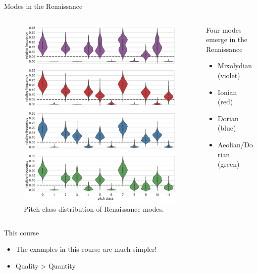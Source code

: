 \begin{frame}{Modes in the Renaissance}
    \begin{columns}
        \begin{column}{.6\linewidth}
            \begin{figure}
                \centering
                \includegraphics[width=\linewidth,height=.8\textheight,keepaspectratio]{img/Figure7.pdf}
                \caption{Pitch-class distribution of Renaissance modes.}
            \end{figure}
        \end{column}
        \hfill
        \begin{column}{.4\linewidth}
            Four modes emerge in the Renaissance
            
            \begin{itemize}
                \item Mixolydian (violet)
                \item Ionian (red)
                \item Dorian (blue)
                \item Aeolian/Dorian (green)
            \end{itemize}
        \end{column}
    \end{columns}
\end{frame}

\begin{frame}{This course}
    \begin{itemize}
        \item The examples in this course are much simpler!
        \item Quality > Quantity
    \end{itemize}
\end{frame}